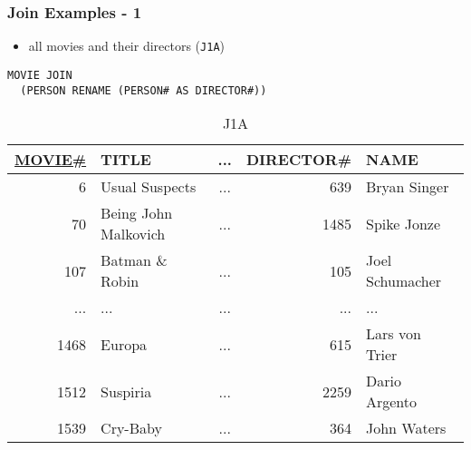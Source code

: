 \documentclass[dvipsnames]{beamer}
\theoremstyle{plain}
\begin{document}
\begin{frame}[fragile]
  \frametitle{Join Examples - 1}

  \begin{example}
    \begin{itemize}
      \item all movies and their directors (\texttt{J1A})
    \end{itemize}

    \begin{lstlisting}
MOVIE JOIN
  (PERSON RENAME (PERSON# AS DIRECTOR#))
    \end{lstlisting}

    \pause
    \vspace{-10pt}
    \begin{tiny}
    \begin{table}
      \caption{J1A}
      \begin{tabular}{|r|l|c|r|l|}\hline
\underline{MOVIE\#} & TITLE & ... & DIRECTOR\# & NAME            \\[2pt]\hline\hline
   6 & Usual Suspects       & ... &       639  & Bryan Singer    \\\hline
  70 & Being John Malkovich & ... &      1485  & Spike Jonze     \\\hline
 107 & Batman \& Robin      & ... &       105  & Joel Schumacher \\\hline
 ... & ...                  & ... &       ...  & ...             \\\hline
1468 & Europa               & ... &       615  & Lars von Trier  \\\hline
1512 & Suspiria             & ... &      2259  & Dario Argento   \\\hline
1539 & Cry-Baby             & ... &       364  & John Waters     \\\hline
      \end{tabular}
    \end{table}
    \end{tiny}
  \end{example}
\end{frame}
\end{document}
